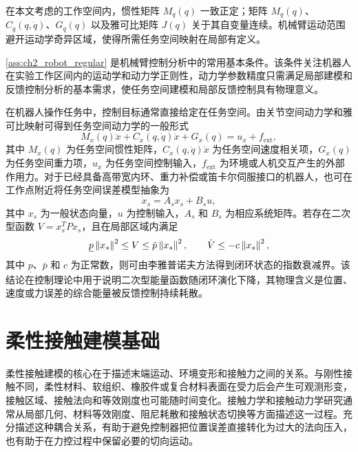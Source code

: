\begin{assumption}[机械臂模型的正则性]
\label{ass:ch2_robot_regular}
在本文考虑的工作空间内，惯性矩阵 $M_q(q)$ 一致正定；矩阵 $M_q(q)$、$C_q(q,\dot q)$、$G_q(q)$ 以及雅可比矩阵 $J(q)$ 关于其自变量连续。机械臂运动范围避开运动学奇异区域，使得所需任务空间映射在局部有定义。
\end{assumption}

\begin{remark}
\cref{ass:ch2_robot_regular} 是机械臂控制分析中的常用基本条件。该条件关注机器人在实验工作区间内的运动学和动力学正则性，动力学参数精度只需满足局部建模和反馈控制分析的基本需求，使任务空间建模和局部反馈控制具有物理意义。
\end{remark}

在机器人操作任务中，控制目标通常直接给定在任务空间。由关节空间动力学和雅可比映射可得到任务空间动力学的一般形式
\begin{equation}
  M_x(q)\ddot x+C_x(q,\dot q)\dot x+G_x(q)=u_x+f_{\mathrm{ext}},
  \label{eq:ch2_task_dynamics}
\end{equation}
其中 $M_x(q)$ 为任务空间惯性矩阵，$C_x(q,\dot q)\dot x$ 为任务空间速度相关项，$G_x(q)$ 为任务空间重力项，$u_x$ 为任务空间控制输入，$f_{\mathrm{ext}}$ 为环境或人机交互产生的外部作用力。对于已经具备高带宽内环、重力补偿或笛卡尔伺服接口的机器人，也可在工作点附近将任务空间误差模型抽象为
\begin{equation}
  \dot x_s=A_sx_s+B_su,
  \label{eq:ch2_general_state_space}
\end{equation}
其中 $x_s$ 为一般状态向量，$u$ 为控制输入，$A_s$ 和 $B_s$ 为相应系统矩阵。若存在二次型函数 $V=x_s^TPx_s$，且在局部区域内满足
\begin{equation}
  \underline p\left\lVert x_s\right\rVert^2\le V\le \bar p\left\lVert x_s\right\rVert^2,\qquad
  \dot V\le -c\left\lVert x_s\right\rVert^2,
  \label{eq:ch2_lyap_embedded}
\end{equation}
其中 $\underline p$、$\bar p$ 和 $c$ 为正常数，则可由李雅普诺夫方法得到闭环状态的指数衰减界\cite{khalil2002nonlinear}。该结论在控制理论中用于说明二次型能量函数随闭环演化下降，其物理含义是位置、速度或力误差的综合能量被反馈控制持续耗散。

\section{柔性接触建模基础}
\label{sec:ch2_contact_modeling}

柔性接触建模的核心在于描述末端运动、环境变形和接触力之间的关系。与刚性接触不同，柔性材料、软组织、橡胶件或复合材料表面在受力后会产生可观测形变，接触区域、接触法向和等效刚度也可能随时间变化。接触力学和接触动力学研究通常从局部几何、材料等效刚度、阻尼耗散和接触状态切换等方面描述这一过程\cite{johnson1985contact,gilardi2002survey}。充分描述这种耦合关系，有助于避免控制器把位置误差直接转化为过大的法向压入，也有助于在力控过程中保留必要的切向运动。

